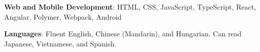 





\textbf{Web and Mobile Development}: HTML, CSS, JavaScript, TypeScript, React, Angular, Polymer, Webpack, Android %


\textbf{Languages}: Fluent English, Chinese (Mandarin), and Hungarian. Can read Japanese, Vietnamese, and Spanish.\\

\vspace{-1mm}